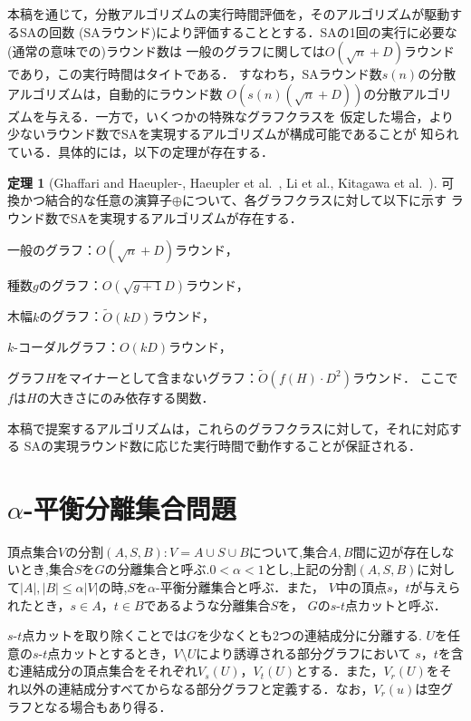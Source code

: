 \documentclass{thesis}
\theoremstyle{definition}
\newtheorem{theorem}{定理}
\begin{document}
本稿を通じて，分散アルゴリズムの実行時間評価を，そのアルゴリズムが駆動するSAの回数
(SAラウンド)により評価することとする．SAの1回の実行に必要な(通常の意味での)ラウンド数は
一般のグラフに関しては$O(\sqrt{n} + D)$ラウンドであり，この実行時間はタイトである．
すなわち，SAラウンド数$s(n)$の分散アルゴリズムは，自動的にラウンド数
$O(s(n)(\sqrt{n} + D))$の分散アルゴリズムを与える．一方で，いくつかの特殊なグラフクラスを
仮定した場合，より少ないラウンド数でSAを実現するアルゴリズムが構成可能であることが
知られている．具体的には，以下の定理が存在する．
\begin{theorem}[Ghaffari and Haeupler-\cite{ghaffari2016distributed}, Haeupler et al.~\cite{HIZ16}, Li et al.\cite{}, Kitagawa et al.~\cite{}] \label{SA}
    可換かつ結合的な任意の演算子$\oplus$について、各グラフクラスに対して以下に示す
    ラウンド数でSAを実現するアルゴリズムが存在する．
    \item 一般のグラフ：$O(\sqrt{n} + D)$ラウンド，
    \item 種数$g$のグラフ：$O(\sqrt{g+1}D)$ラウンド，
    \item 木幅$k$のグラフ：$\tilde{O}(kD)$ラウンド，
    \item $k$-コーダルグラフ：$O(kD)$ラウンド，
    \item グラフ$H$をマイナーとして含まないグラフ：$\tilde{O}(f(H)\cdot D^2)$ラウンド．
    ここで$f$は$H$の大きさにのみ依存する関数．
\end{theorem}
本稿で提案するアルゴリズムは，これらのグラフクラスに対して，それに対応する
SAの実現ラウンド数に応じた実行時間で動作することが保証される．

\section{$\alpha$-平衡分離集合問題}
頂点集合$V$の分割$(A,S,B):V=A \cup S \cup B$について,集合$A,B$間に辺が存在しないとき,集合$S$を$G$の分離集合と呼ぶ.$0 < \alpha < 1$とし,上記の分割$(A,S,B)$に対して$|A|,|B|\leq \alpha|V|$の時,$S$を$\alpha$-平衡分離集合と呼ぶ．また，
$V$中の頂点$s$，$t$が与えられたとき，$s \in A$，$t \in B$であるような分離集合$S$を，
$G$の$s$-$t$点カットと呼ぶ．

$s$-$t$点カットを取り除くことでは$G$を少なくとも2つの連結成分に分離する.
$U$を任意の$s$-$t$点カットとするとき，$V \setminus U$により誘導される部分グラフにおいて
$s$，$t$を含む連結成分の頂点集合をそれぞれ$V_s(U)$，$V_t(U)$とする．また，$V_r(U)$をそれ以外の連結成分すべてからなる部分グラフと定義する．なお，$V_r(u)$は空グラフとなる場合もあり得る．
\end{document}
